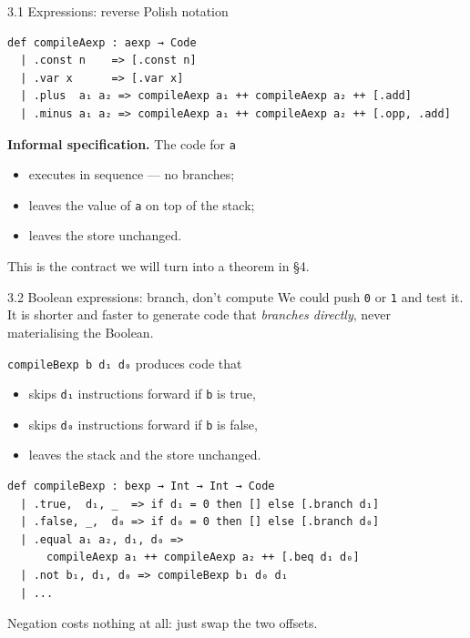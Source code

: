 \documentclass[aspectratio=169,10pt]{beamer}
\newcommand{\code}[1]{\texttt{\small #1}}
\begin{document}
\begin{frame}[fragile]{3.1 Expressions: reverse Polish notation}
\begin{lstlisting}
def compileAexp : aexp → Code
  | .const n    => [.const n]
  | .var x      => [.var x]
  | .plus  a₁ a₂ => compileAexp a₁ ++ compileAexp a₂ ++ [.add]
  | .minus a₁ a₂ => compileAexp a₁ ++ compileAexp a₂ ++ [.opp, .add]
\end{lstlisting}

\textbf{Informal specification.}  The code for \code{a}
\begin{itemize}
\item executes in sequence --- no branches;
\item leaves the value of \code{a} on top of the stack;
\item leaves the store unchanged.
\end{itemize}
\medskip
This is the contract we will turn into a theorem in \S4.
\end{frame}

\begin{frame}[fragile]{3.2 Boolean expressions: branch, don't compute}
We could push \code{0} or \code{1} and test it.  It is shorter and faster to
generate code that \emph{branches directly}, never materialising the Boolean.
\medskip

\code{compileBexp b d₁ d₀} produces code that
\begin{itemize}
\item skips \code{d₁} instructions forward if \code{b} is true,
\item skips \code{d₀} instructions forward if \code{b} is false,
\item leaves the stack and the store unchanged.
\end{itemize}
\begin{lstlisting}
def compileBexp : bexp → Int → Int → Code
  | .true,  d₁, _  => if d₁ = 0 then [] else [.branch d₁]
  | .false, _,  d₀ => if d₀ = 0 then [] else [.branch d₀]
  | .equal a₁ a₂, d₁, d₀ =>
      compileAexp a₁ ++ compileAexp a₂ ++ [.beq d₁ d₀]
  | .not b₁, d₁, d₀ => compileBexp b₁ d₀ d₁
  | ...
\end{lstlisting}
Negation costs nothing at all: just swap the two offsets.
\end{frame}
\end{document}
